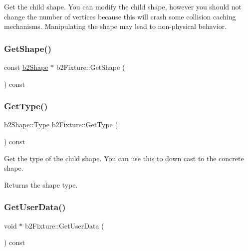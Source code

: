 Get the child shape. You can modify the child shape, however you should not change the number of vertices because this will crash some collision caching mechanisms. Manipulating the shape may lead to non-\/physical behavior. \mbox{\label{classb2_fixture_a783f8bcb19eee659686284872e70f383}} 
\subsubsection{\texorpdfstring{GetShape()}{GetShape()}\hspace{0.1cm}{\footnotesize\ttfamily [2/2]}}
{\footnotesize\ttfamily const \mbox{\hyperlink{classb2_shape}{b2\+Shape}} $\ast$ b2\+Fixture\+::\+Get\+Shape (\begin{DoxyParamCaption}{ }\end{DoxyParamCaption}) const\hspace{0.3cm}{\ttfamily [inline]}}

\mbox{\label{classb2_fixture_a7a566c1e3b768f6a72ebc3b758aad70e}} 
\subsubsection{\texorpdfstring{GetType()}{GetType()}}
{\footnotesize\ttfamily \mbox{\hyperlink{classb2_shape_a4c1f3a9ad6b3150bb90ad9018ca4b1e0}{b2\+Shape\+::\+Type}} b2\+Fixture\+::\+Get\+Type (\begin{DoxyParamCaption}{ }\end{DoxyParamCaption}) const\hspace{0.3cm}{\ttfamily [inline]}}

Get the type of the child shape. You can use this to down cast to the concrete shape. \begin{DoxyReturn}{Returns}
the shape type. 
\end{DoxyReturn}
\mbox{\label{classb2_fixture_ae2a865ed59ffe9b1cb89f577052f4d50}} 
\subsubsection{\texorpdfstring{GetUserData()}{GetUserData()}}
{\footnotesize\ttfamily void $\ast$ b2\+Fixture\+::\+Get\+User\+Data (\begin{DoxyParamCaption}{ }\end{DoxyParamCaption}) const\hspace{0.3cm}{\ttfamily [inline]}}

